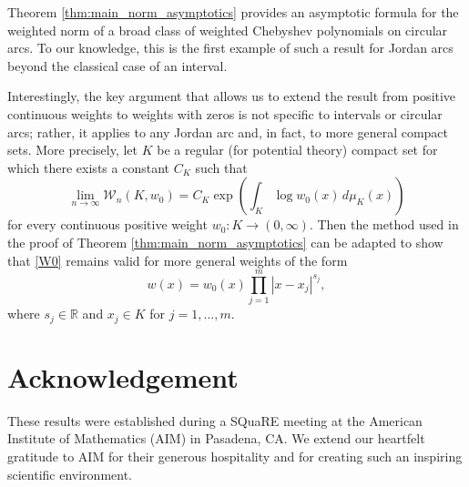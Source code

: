\documentclass[12pt,oneside,reqno]{amsart}
\theoremstyle{definition}
\newtheorem*{remark}{Remark}
\numberwithin{equation}{section}
\newcommand{\R}{{\mathbb R}}
\newcommand{\cW}{{\mathcal{W}}}
\begin{document}
Theorem \ref{thm:main_norm_asymptotics} provides an asymptotic formula for the weighted norm of a broad class of weighted Chebyshev polynomials on circular arcs. To our knowledge, this is the first example of such a result for Jordan arcs beyond the classical case of an interval.

Interestingly, the key argument that allows us to extend the result from positive continuous weights to weights with zeros is not specific to intervals or circular arcs; rather, it applies to any %
Jordan arc and, in fact, to more general compact sets. More precisely, let $K$ be a regular (for potential theory) compact set for which there exists a constant $C_K$ such that
	\begin{equation} \label{W0}
	\lim_{n\rightarrow \infty}\cW_n(K,w_0)= 
	C_K\exp\left(\int_{K} \log w_0(x)\,d\mu_{K}(x)\right)
	\end{equation}
	for every continuous positive weight $w_0:K\to (0,\infty)$. Then the method used in the proof of Theorem \ref{thm:main_norm_asymptotics} can be adapted to show that \eqref{W0} remains valid for more general weights of the form
	\begin{equation}
	   w(x) = w_0(x)\prod_{j=1}^{m}|x-x_j|^{s_j},
	\end{equation}   
	where $s_j\in \R$ and $x_j\in K$ for $j=1,\dots,m$.


\section*{Acknowledgement}
These results were established during a SQuaRE meeting at the American Institute of Mathematics (AIM) in Pasadena, CA. We extend our heartfelt gratitude to AIM for their generous hospitality and for creating such an inspiring scientific environment.
\end{document}
